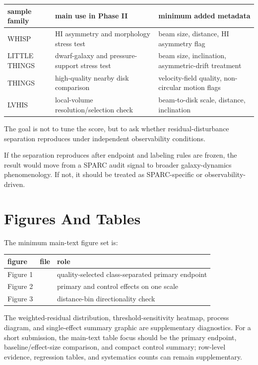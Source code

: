 \documentclass[11pt]{article}
\begin{document}
\begin{table}[htbp]
\centering
\footnotesize
\setlength{\tabcolsep}{3pt}
\begin{tabularx}{\linewidth}{Y Y Y}
\toprule
sample family & main use in Phase II & minimum added metadata \\
\midrule
WHISP & HI asymmetry and morphology stress test & beam size, distance, HI asymmetry flag \\
LITTLE THINGS & dwarf-galaxy and pressure-support stress test & beam size, inclination, asymmetric-drift treatment \\
THINGS & high-quality nearby disk comparison & velocity-field quality, non-circular motion flags \\
LVHIS & local-volume resolution/selection check & beam-to-disk scale, distance, inclination \\
\bottomrule
\end{tabularx}
\end{table}
The goal is not to tune the score, but to ask whether residual-disturbance separation reproduces under independent observability conditions.

If the separation reproduces after endpoint and labeling rules are frozen, the result would move from a SPARC audit signal to broader galaxy-dynamics phenomenology. If not, it should be treated as SPARC-specific or observability-driven.

\section{Figures And Tables}
The minimum main-text figure set is:

\begin{table}[htbp]
\centering
\footnotesize
\setlength{\tabcolsep}{3pt}
\begin{tabularx}{\linewidth}{Y Y Y}
\toprule
figure & file & role \\
\midrule
Figure 1 &  & quality-selected class-separated primary endpoint \\
Figure 2 &  & primary and control effects on one scale \\
Figure 3 &  & distance-bin directionality check \\
\bottomrule
\end{tabularx}
\end{table}
The weighted-residual distribution, threshold-sensitivity heatmap, process diagram, and single-effect summary graphic are supplementary diagnostics. For a short submission, the main-text table focus should be the primary endpoint, baseline/effect-size comparison, and compact control summary; row-level evidence, regression tables, and systematics counts can remain supplementary.
\end{document}
